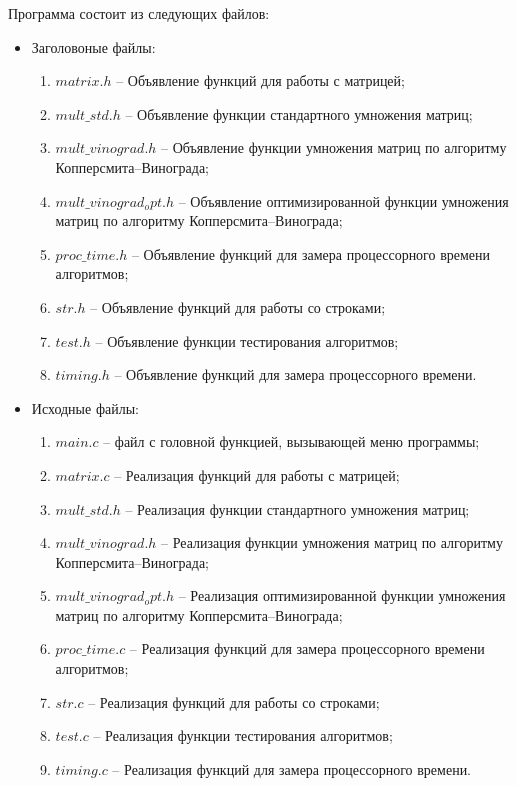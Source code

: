 Программа состоит из следующих файлов:
\begin{itemize}
    \item Заголовоные файлы:
    \begin{enumerate}
        \item $matrix.h$ -- Объявление функций для работы с матрицей;
        \item $mult\_std.h$ -- Объявление функции стандартного умножения матриц;
        \item $mult\_vinograd.h$ -- Объявление функции умножения матриц по алгоритму Копперсмита--Винограда;
        \item $mult\_vinograd_opt.h$ -- Объявление оптимизированной функции умножения матриц по алгоритму Копперсмита--Винограда;
        \item $proc\_time.h$ -- Объявление функций для замера процессорного времени алгоритмов;
        \item $str.h$ -- Объявление функций для работы со строками;
        \item $test.h$ -- Объявление функции тестирования алгоритмов;
        \item $timing.h$ -- Объявление функций для замера процессорного времени.
    \end{enumerate}
    \item Исходные файлы:
    \begin{enumerate}
        \item $main.c$ -- файл с головной функцией, вызывающей меню программы;
        \item $matrix.c$ -- Реализация функций для работы с матрицей;
        \item $mult\_std.h$ -- Реализация функции стандартного умножения матриц;
        \item $mult\_vinograd.h$ -- Реализация функции умножения матриц по алгоритму Копперсмита--Винограда;
        \item $mult\_vinograd_opt.h$ -- Реализация оптимизированной функции умножения матриц по алгоритму Копперсмита--Винограда;
        \item $proc\_time.c$ -- Реализация функций для замера процессорного времени алгоритмов;
        \item $str.c$ -- Реализация функций для работы со строками;
        \item $test.c$ -- Реализация функции тестирования алгоритмов;
        \item $timing.c$ -- Реализация функций для замера процессорного времени.
    \end{enumerate}
\end{itemize}

